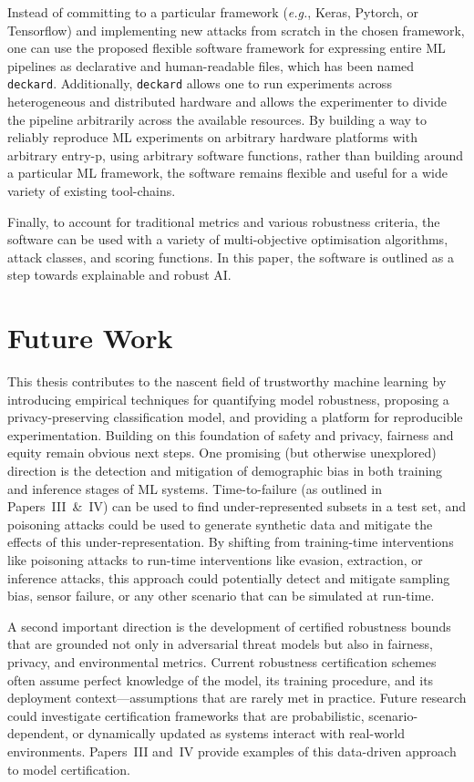 Instead of committing to a particular framework (\textit{e.g.}, Keras, Pytorch, or Tensorflow) and implementing new attacks from scratch in the chosen framework, one can use the proposed flexible software framework for expressing entire ML pipelines as declarative and human-readable files, which has been named \texttt{deckard}.
Additionally, \texttt{deckard} allows one to run experiments across heterogeneous and distributed hardware and allows the experimenter to divide the pipeline arbitrarily across the available resources.
By building a way to reliably reproduce ML experiments on arbitrary hardware platforms with arbitrary entry-p\@oints, using arbitrary software functions, rather than building around a particular ML framework, the software remains flexible and useful for a wide variety of existing tool-chains.

Finally, to account for traditional metrics and various robustness criteria, the software can be used with a variety of multi-objective optimisation algorithms, attack classes, and scoring functions.
In this paper, the software is outlined as a step towards explainable and robust AI\@.

\newpage

\section{Future Work}

This thesis contributes to the nascent field of trustworthy machine learning by introducing empirical techniques for quantifying model robustness, proposing a privacy-preserving classification model, and providing a platform for reproducible experimentation. 
Building on this foundation of safety and privacy, fairness and equity remain obvious next steps.
One promising (but otherwise unexplored) direction is the detection and mitigation of demographic bias in both training and inference stages of ML systems.
Time-to-failure (as outlined in Papers~III~\&~IV) can be used to find under-represented subsets in a test set, and poisoning attacks could be used to generate synthetic data and mitigate the effects of this under-representation.
By shifting from training-time interventions like poisoning attacks to run-time interventions like evasion, extraction, or inference attacks, this approach could potentially detect and mitigate sampling bias, sensor failure, or any other scenario that can be simulated at run-time.

A second important direction is the development of certified robustness bounds that are grounded not only in adversarial threat models but also in fairness, privacy, and environmental metrics. 
Current robustness certification schemes often assume perfect knowledge of the model, its training procedure, and its deployment context---assumptions that are rarely met in practice.
Future research could investigate certification frameworks that are probabilistic, scenario-dependent, or dynamically updated as systems interact with real-world environments.
Papers~III and~IV provide examples of this data-driven approach to model certification.


